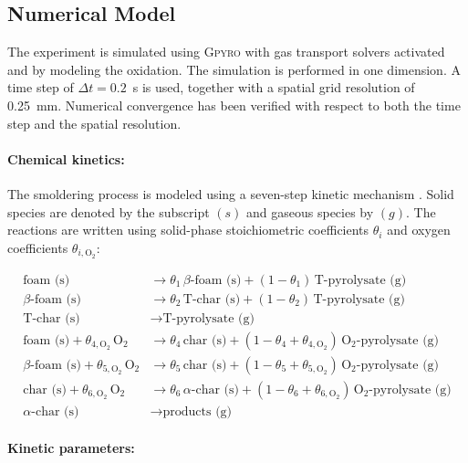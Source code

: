 \documentclass[12pt]{article}
\begin{document}
\subsection{Numerical Model}

The experiment is simulated using \textsc{Gpyro} with gas transport solvers activated and by modeling the oxidation. The simulation is performed in one dimension. A time step of $\Delta t = 0.2$~s is used, together with a spatial grid resolution of 0.25~mm. Numerical convergence has been verified with respect to both the time step and the spatial resolution.

\paragraph{Chemical kinetics:}
The smoldering process is modeled using a seven-step kinetic mechanism \cite{dodd_numerical_2009}. Solid species are denoted by the subscript $(s)$ and gaseous species by $(g)$. The reactions are written using solid-phase stoichiometric coefficients $\theta_i$ and oxygen coefficients $\theta_{i,\mathrm{O_2}}$:

\begin{align}
\text{foam (s)} &\rightarrow \theta_1\,\text{\(\beta\)-foam (s)} + (1-\theta_1)\,\text{T-pyrolysate (g)} \label{eq:r1} \\
\text{\(\beta\)-foam (s)} &\rightarrow \theta_2\,\text{T-char (s)} + (1-\theta_2)\,\text{T-pyrolysate (g)} \label{eq:r2} \\
\text{T-char (s)} &\rightarrow \text{T-pyrolysate (g)} \label{eq:r3} \\
\text{foam (s)} + \theta_{4,\mathrm{O_2}}\,\mathrm{O_2} 
&\rightarrow \theta_4\,\text{char (s)} + (1-\theta_4+\theta_{4,\mathrm{O_2}})\,\mathrm{O_2} \text{-pyrolysate (g)} \label{eq:r4} \\
\text{\(\beta\)-foam (s)} + \theta_{5,\mathrm{O_2}}\,\mathrm{O_2} 
&\rightarrow \theta_5\,\text{char (s)} + (1-\theta_5+\theta_{5,\mathrm{O_2}})\,\mathrm{O_2} \text{-pyrolysate (g)} \label{eq:r5} \\
\text{char (s)} + \theta_{6,\mathrm{O_2}}\,\mathrm{O_2} 
&\rightarrow \theta_6\,\text{\(\alpha\)-char (s)} + (1-\theta_6+\theta_{6,\mathrm{O_2}})\,\mathrm{O_2} \text{-pyrolysate (g)} \label{eq:r6} \\
\text{\(\alpha\)-char (s)} &\rightarrow \text{products (g)} \label{eq:r7}
\end{align}



\paragraph{Kinetic parameters:}
\end{document}
